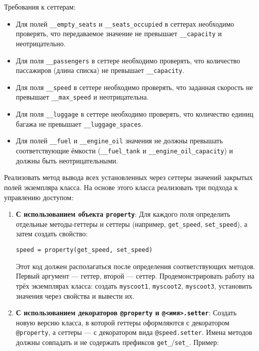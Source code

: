 \begin{enumerate}
\begin{itemize}
\end{itemize}
Требования к сеттерам:
\begin{itemize}
    \item Для полей \texttt{\_\_empty\_seats} и \texttt{\_\_seats\_occupied} в сеттерах необходимо проверять, что передаваемое значение не превышает \texttt{\_\_capacity} и неотрицательно.  
    \item Для поля \texttt{\_\_passengers} в сеттере необходимо проверять, что количество пассажиров (длина списка) не превышает \texttt{\_\_capacity}.  
    \item Для поля \texttt{\_\_speed} в сеттере необходимо проверять, что заданная скорость не превышает \texttt{\_\_max\_speed} и неотрицательна.  
    \item Для поля \texttt{\_\_luggage} в сеттере необходимо проверять, что количество единиц багажа не превышает \texttt{\_\_luggage\_spaces}.
    \item Для полей \texttt{\_\_fuel} и \texttt{\_\_engine\_oil} значения не должны превышать соответствующие ёмкости (\texttt{\_\_fuel\_tank} и \texttt{\_\_engine\_oil\_capacity}) и должны быть неотрицательными.
\end{itemize}
Реализовать метод вывода всех установленных через сеттеры значений закрытых полей экземпляра класса.
На основе этого класса реализовать три подхода к управлению доступом:
\begin{enumerate}
    \item \textbf{С использованием объекта \texttt{property}}:  
    Для каждого поля определить отдельные методы-геттеры и сеттеры (например, \texttt{get\_speed}, \texttt{set\_speed}), а затем создать свойство:  
    \begin{verbatim}
speed = property(get_speed, set_speed)
    \end{verbatim}  
    Этот код должен располагаться после определения соответствующих методов. Первый аргумент — геттер, второй — сеттер.  
    Продемонстрировать работу на трёх экземплярах класса: создать \texttt{myscoot1}, \texttt{myscoot2}, \texttt{myscoot3}, установить значения через свойства и вывести их.
    \item \textbf{С использованием декораторов \texttt{@property} и \texttt{@<имя>.setter}}:  
    Создать новую версию класса, в которой геттеры оформляются с декоратором \texttt{@property}, а сеттеры — с декоратором вида \texttt{@speed.setter}. Имена методов должны совпадать и не содержать префиксов \texttt{get\_}/\texttt{set\_}.  
    Пример:  
    \begin{verbatim}

\end{verbatim}
\end{enumerate}
\end{enumerate}
